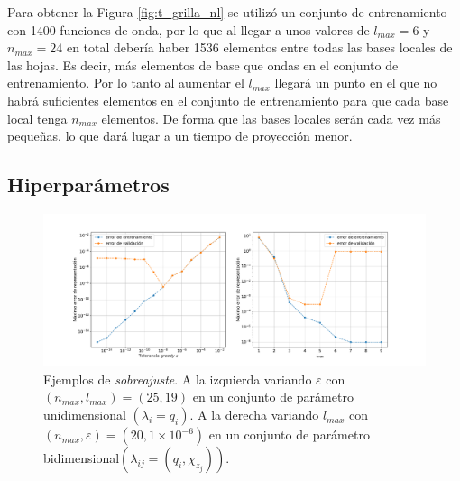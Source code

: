 Para obtener la Figura \ref{fig:t_grilla_nl} se utilizó un conjunto de entrenamiento con 1400 funciones de onda, por lo que al llegar a unos valores de $l_{max} = 6$ y $n_{max} = 24$ en total debería haber 1536 elementos entre todas las bases locales de las hojas. Es decir, más elementos de base que ondas en el conjunto de entrenamiento. Por lo tanto al aumentar el $l_{max}$ llegará un punto en el que no habrá suficientes elementos en el conjunto de entrenamiento para que cada base local tenga $n_{max}$ elementos. De forma que las bases locales serán cada vez más pequeñas, lo que dará lugar a un tiempo de proyección menor.



\subsection{Hiperparámetros}

\begin{figure}[h!]
\centering
\includegraphics[width=1\columnwidth ,trim={2cm, 1cm, 1cm, 1.2cm}]{figs/overfit.pdf}
\caption{Ejemplos de \textit{sobreajuste}. A la izquierda variando $\varepsilon$ con $(n_{max}, l_{max}) = (25, 19)$ en un conjunto de parámetro unidimensional $(\lambda_i = q_i)$. A la derecha variando $l_{max}$ con $(n_{max}, \varepsilon) = (20, 1\times10^{-6})$ en un conjunto de parámetro bidimensional$(\lambda_{ij} = (q_i, \chi_{z_j})) $.}
\label{fig:overfit}
\end{figure}

